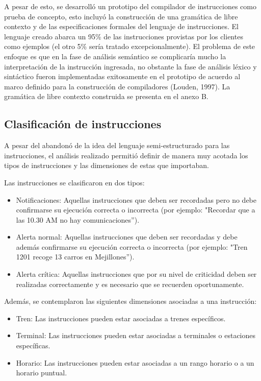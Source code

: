 \documentclass[oneside,12pt, letterpaper, titlepage]{book}
\begin{document}
A pesar de esto, se desarrolló un prototipo del compilador de instrucciones como prueba de concepto, esto incluyó la construcción de una gramática de libre contexto y de las especificaciones formales del lenguaje de instrucciones. El lenguaje creado abarca un 95\% de las instrucciones provistas por los clientes como ejemplos (el otro 5\% sería tratado excepcionalmente). El problema de este enfoque es que en la fase de análisis semántico se complicaría mucho la interpretación de la instrucción ingresada, no obstante la fase de análisis léxico y sintáctico fueron implementadas exitosamente en el prototipo de acuerdo al marco definido para la construcción de compiladores (Louden, 1997). La gramática de libre contexto construida se presenta en el anexo B.

\subsection{Clasificación de instrucciones}
A pesar del abandonó de la idea del lenguaje semi-estructurado para las instrucciones, el análisis realizado permitió definir de manera muy acotada los tipos de instrucciones y las dimensiones de estas que importaban.

Las instrucciones se clasificaron en dos tipos:
\begin{itemize}
\item Notificaciones: Aquellas instrucciones que deben ser recordadas pero no debe confirmarse su ejecución correcta o incorrecta (por ejemplo: "Recordar que a las 10.30 AM no hay comunicaciones'').
\item Alerta normal: Aquellas instrucciones que deben ser recordadas y debe además confirmarse su ejecución correcta o incorrecta (por ejemplo: "Tren 1201 recoge 13 carros en Mejillones'').
\item Alerta crítica: Aquellas instrucciones que por su nivel de criticidad deben ser realizadas correctamente y es necesario que se recuerden oportunamente. 
\end{itemize}

Además, se contemplaron las siguientes dimensiones asociadas a una instrucción:
\begin{itemize}
\item Tren: Las instrucciones pueden estar asociadas a trenes específicos.
\item Terminal: Las instrucciones pueden estar asociadas a terminales o estaciones específicas.
\item Horario: Las instrucciones pueden estar asociadas a un rango horario o a un horario puntual.
\end{itemize}
\end{document}
